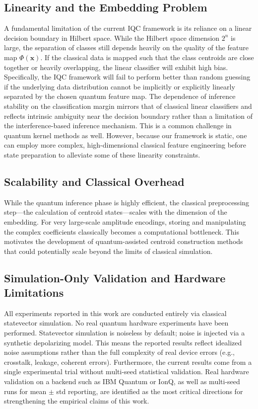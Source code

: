 \documentclass[conference]{IEEEtran}
\begin{document}
\subsection{Linearity and the Embedding Problem}

A fundamental limitation of the current IQC framework is its reliance on a linear decision boundary in Hilbert space. While the Hilbert space dimension $2^n$ is large, the separation of classes still depends heavily on the quality of the feature map $\Phi(\mathbf{x})$. If the classical data is mapped such that the class centroids are close together or heavily overlapping, the linear classifier will exhibit high bias. Specifically, the IQC framework will fail to perform better than random guessing if the underlying data distribution cannot be implicitly or explicitly linearly separated by the chosen quantum feature map. The dependence of inference stability on the classification margin mirrors that of classical linear classifiers and reflects intrinsic ambiguity near the decision boundary rather than a limitation of the interference-based inference mechanism. This is a common challenge in quantum kernel methods as well. However, because our framework is static, one can employ more complex, high-dimensional classical feature engineering before state preparation to alleviate some of these linearity constraints.

\subsection{Scalability and Classical Overhead}

While the quantum inference phase is highly efficient, the classical preprocessing step---the calculation of centroid states---scales with the dimension of the embedding. For very large-scale amplitude encodings, storing and manipulating the complex coefficients classically becomes a computational bottleneck. This motivates the development of quantum-assisted centroid construction methods that could potentially scale beyond the limits of classical simulation.

\subsection{Simulation-Only Validation and Hardware Limitations}

All experiments reported in this work are conducted entirely via classical statevector simulation. No real quantum hardware experiments have been performed. Statevector simulation is noiseless by default; noise is injected via a synthetic depolarizing model. This means the reported results reflect idealized noise assumptions rather than the full complexity of real device errors (e.g., crosstalk, leakage, coherent errors). Furthermore, the current results come from a single experimental trial without multi-seed statistical validation. Real hardware validation on a backend such as IBM Quantum or IonQ, as well as multi-seed runs for mean $\pm$ std reporting, are identified as the most critical directions for strengthening the empirical claims of this work.
\end{document}

